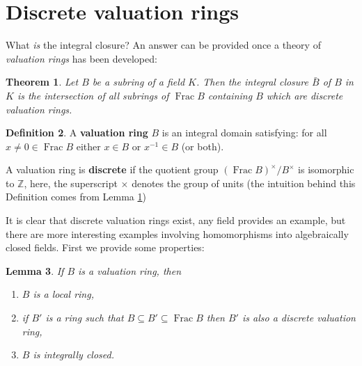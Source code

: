 \documentclass[12pt]{article}
\theoremstyle{plain}
\newtheorem{thm}{Theorem}[subsection] %
\newtheorem{lemma}[thm]{Lemma}
\theoremstyle{definition}
\newtheorem{defn}[thm]{Definition} %
\newcommand{\bb}[1]{\mathbb{#1}}
\begin{document}
\section{Discrete valuation rings}
What \emph{is} the integral closure? An answer can be provided once a theory of \emph{valuation rings} has been developed:
\begin{thm}
\label{thm:discrete_valuation_intersection}
Let $B$ be a subring of a field $K$. Then the integral closure $\bar{B}$ of $B$ in $K$ is the intersection of all subrings of $\operatorname{Frac}B$ containing $B$ which are \emph{discrete valuation rings}.
\end{thm}
\begin{defn}
A \textbf{valuation ring} $B$ is an integral domain satisfying: for all $x\neq 0 \in \operatorname{Frac}B$ either $x \in B$ or $x^{-1} \in B$ (or both).

A valuation ring is \textbf{discrete} if the quotient group $(\operatorname{Frac}B)^{\times}/B^\times$ is isomorphic to $\bb{Z}$, here, the superscript $\times$ denotes the group of units (the intuition behind this Definition comes from Lemma \ref{})
\end{defn}
It is clear that discrete valuation rings exist, any field provides an example, but there are more interesting examples involving homomorphisms into algebraically closed fields. First we provide some properties:
\begin{lemma}
If $B$ is a valuation ring, then
\begin{enumerate}
    \item\label{lem:discrete_valuation_local} $B$ is a local ring,
    \item\label{lem:discrete_valuation_between} if $B'$ is a ring such that $B \subseteq B' \subseteq \operatorname{Frac}B$ then $B'$ is also a discrete valuation ring,
    \item\label{lem:discrete_valuation_integrally_closed} $B$ is integrally closed.
\end{enumerate}
\end{lemma}
\end{document}
